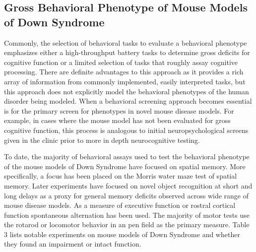 \documentclass{article}
\begin{document}
\subsection{Gross Behavioral Phenotype of Mouse Models of Down Syndrome}

Commonly, the selection of behavioral tasks to evaluate a behavioral phenotype emphasizes either a high-throughput battery tasks to determine gross deficits for cognitive function or a limited selection of tasks that roughly assay cognitive processing. There are definite advantages to this approach as it provides a rich array of information from commonly implemented, easily interpreted tasks, but this approach does not explicitly model the behavioral phenotypes of the human disorder being modeled. When a behavioral screening approach becomes essential is for the primary screen for phenotypes in novel mouse disease models. For example, in cases where the mouse model has not been evaluated for gross cognitive function, this process is analogous to initial neuropsychological screens given in the clinic prior to more in depth neurocognitive testing.

To date, the majority of behavioral assays used to test the behavioral phenotype of the mouse models of Down Syndrome have focused on spatial memory. More specifically, a focus has been placed on the Morris water maze test of spatial memory. Later experiments have focused on novel object recognition at short and long delays as a proxy for general memory deficits observed across wide range of mouse disease models. As a measure of executive function or rostral cortical function spontaneous alternation has been used. The majority of motor tests use the rotarod or locomotor behavior in an pen field as the primary measure. Table 3 lists notable experiments on mouse models of Down Syndrome and whether they found an impairment or intact function.
\end{document}
